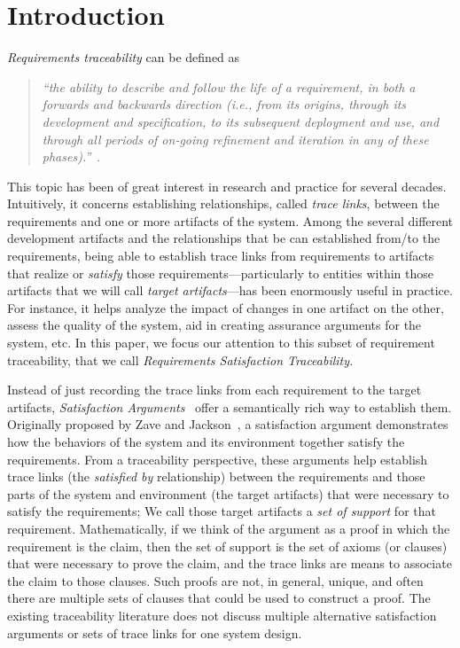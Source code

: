 \section{Introduction}

\emph{Requirements traceability} can be defined as 
\begin{quotation}
\textit{``the ability to describe and follow the life of a requirement, in both a forwards and backwards direction (i.e., from its origins, through its development and specification, to its subsequent deployment and use, and through all periods of on-going refinement and iteration in any of these phases).''}~\cite{gotel}.
\end{quotation}
This topic has been of great interest in research and practice for several decades. Intuitively, it concerns establishing relationships, called \emph{trace links}, between the requirements and one or more artifacts of the system. Among the several different development artifacts and the relationships that be can established from/to the requirements, being able to establish trace links from requirements to artifacts that realize or \emph{satisfy} those requirements---particularly to entities within those artifacts that we will call \emph{target artifacts}---has been enormously useful in practice. For instance, it helps analyze the impact of changes in one artifact on the other, assess the quality of the system, aid in creating assurance arguments for the system, etc. In this paper, we focus our attention to this subset of requirement traceability, that we call \emph{Requirements Satisfaction Traceability.}

Instead of just recording the trace links from each requirement to the target artifacts, \emph{Satisfaction Arguments}~\cite{zave1997four} offer a semantically rich way to establish them. Originally proposed by Zave and Jackson~\cite{zave1997four}, a satisfaction argument demonstrates how the behaviors of the system and its environment together satisfy the requirements. From a traceability perspective, these arguments help establish trace links (the \emph{satisfied by} relationship) between the requirements and those parts of the system and environment (the target artifacts) that were necessary to satisfy the requirements; We call those target artifacts a \emph{set of support} for that requirement. Mathematically, if we think of the argument as a proof in which the requirement is the claim, then the set of support is the set of axioms (or clauses) that were necessary to prove the claim, and the trace links are means to associate the claim to those clauses. Such proofs are not, in general, unique, and often there are multiple sets of clauses that could be used to construct a proof.  The existing traceability literature does not discuss multiple alternative satisfaction arguments or sets of trace links for one system design.

